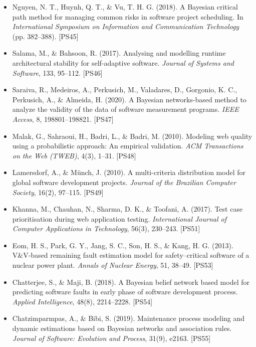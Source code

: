 \begin{itemize}
\item Nguyen, N. T., Huynh, Q. T., \& Vu, T. H. G. (2018).
A Bayesian critical path method for managing common risks in software project scheduling.
In \textit{International Symposium on Information and Communication Technology} (pp. 382--388). [PS45]

\item Salama, M., \& Bahsoon, R. (2017).
Analysing and modelling runtime architectural stability for self-adaptive software.
\textit{Journal of Systems and Software}, 133, 95--112. [PS46]

\item Saraiva, R., Medeiros, A., Perkusich, M., Valadares, D., Gorgonio, K. C., Perkusich, A., \& Almeida, H. (2020).
A Bayesian networks-based method to analyze the validity of the data of software measurement programs.
\textit{IEEE Access}, 8, 198801--198821. [PS47]

\item Malak, G., Sahraoui, H., Badri, L., \& Badri, M. (2010).
Modeling web quality using a probabilistic approach: An empirical validation.
\textit{ACM Transactions on the Web (TWEB)}, 4(3), 1--31. [PS48]

\item Lamersdorf, A., \& Münch, J. (2010).
A multi-criteria distribution model for global software development projects.
\textit{Journal of the Brazilian Computer Society}, 16(2), 97--115. [PS49]

\item Khanna, M., Chauhan, N., Sharma, D. K., \& Toofani, A. (2017).
Test case prioritisation during web application testing.
\textit{International Journal of Computer Applications in Technology}, 56(3), 230--243. [PS51]

\item Eom, H. S., Park, G. Y., Jang, S. C., Son, H. S., \& Kang, H. G. (2013).
V\&V-based remaining fault estimation model for safety--critical software of a nuclear power plant.
\textit{Annals of Nuclear Energy}, 51, 38--49. [PS53]

\item Chatterjee, S., \& Maji, B. (2018).
A Bayesian belief network based model for predicting software faults in early phase of software development process.
\textit{Applied Intelligence}, 48(8), 2214--2228. [PS54]

\item Chatzimparmpas, A., \& Bibi, S. (2019).
Maintenance process modeling and dynamic estimations based on Bayesian networks and association rules.
\textit{Journal of Software: Evolution and Process}, 31(9), e2163. [PS55]


\end{itemize}
